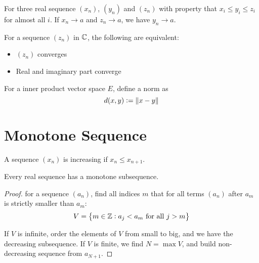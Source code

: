 \begin{theorem}
    For three real sequence $(x_n)$, $(y_n)$ and $(z_n)$ with property that $x_i \leq y_i \leq z_i$ for almost all $i$. If $x_n \rightarrow a$ and $z_n \rightarrow a$, we have $y_n \rightarrow a$.
\end{theorem}

\begin{theorem}
    For a sequence $(z_n)$ in $\mathbb{C}$, the following are equivalent:
    \begin{itemize}
        \item $(z_n)$ converges
        \item Real and imaginary part converge
    \end{itemize}
\end{theorem}

\begin{definition}
    For a inner product vector space $E$, define a norm as 
    \begin{equation}
        d(x,y) := \displaystyle \left\lVert x - y \right\rVert
    \end{equation}
\end{definition}




%
%
%
%

\section{Monotone Sequence}

\begin{definition}[increasing]
    A sequence $(x_n)$ is increasing if $x_n \leq x_{n+1}$.
\end{definition}

\begin{theorem}
    Every real sequence has a monotone subsequence.    
\end{theorem}
\begin{proof}
    for a sequence $(a_n)$, find all indices $m$ that for all terms $(a_n)$ after $a_m$ is strictly smaller than $a_m$:
    \begin{equation}
        V = \set{m \in \mathbb{Z}: a_j < a_m \text{ for all } j > m}
    \end{equation}
    
    If $V$ is infinite, order the elements of $V$ from small to big, and we have the decreasing subsequence. If $V$ is finite, we find $N = \max V$, and build non-decreasing sequence from $a_{N+1}$.
\end{proof}


